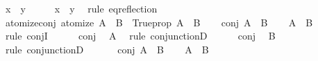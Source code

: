 \begin{isabellebody}
\ {\isachardoublequoteopen}x\ {\isacharequal}{\kern0pt}\ y{\isachardoublequoteclose}\isanewline
\ \ \isamarkupfalse%
\ \isamarkupfalse%
\ {\isachardoublequoteopen}x\ {\isasymequiv}\ y{\isachardoublequoteclose}\ \isamarkupfalse%
\ {\isacharparenleft}{\kern0pt}rule\ eq{\isacharunderscore}{\kern0pt}reflection{\isacharparenright}{\kern0pt}\isanewline
{}\isamarkupfalse%
%
\endisatagproof
{\isafoldproof}%
%
\isadelimproof
\isanewline
%
\endisadelimproof
\isanewline
{}\isamarkupfalse%
\ atomize{\isacharunderscore}{\kern0pt}conj\ {\isacharbrackleft}{\kern0pt}atomize{\isacharbrackright}{\kern0pt}{\isacharcolon}{\kern0pt}\ {\isachardoublequoteopen}{\isacharparenleft}{\kern0pt}A\ {\isacharampersand}{\kern0pt}{\isacharampersand}{\kern0pt}{\isacharampersand}{\kern0pt}\ B{\isacharparenright}{\kern0pt}\ {\isasymequiv}\ Trueprop\ {\isacharparenleft}{\kern0pt}A\ {\isasymand}\ B{\isacharparenright}{\kern0pt}{\isachardoublequoteclose}\isanewline
%
\isadelimproof
%
\endisadelimproof
%
\isatagproof
{}\isamarkupfalse%
\isanewline
\ \ \isamarkupfalse%
\ conj{\isacharcolon}{\kern0pt}\ {\isachardoublequoteopen}A\ {\isacharampersand}{\kern0pt}{\isacharampersand}{\kern0pt}{\isacharampersand}{\kern0pt}\ B{\isachardoublequoteclose}\isanewline
\ \ \isamarkupfalse%
\ {\isachardoublequoteopen}A\ {\isasymand}\ B{\isachardoublequoteclose}\isanewline
\ \ \isamarkupfalse%
\ {\isacharparenleft}{\kern0pt}rule\ conjI{\isacharparenright}{\kern0pt}\isanewline
\ \ \ \ \isamarkupfalse%
\ conj\ \isamarkupfalse%
\ A\ \isamarkupfalse%
\ {\isacharparenleft}{\kern0pt}rule\ conjunctionD{}{\isacharparenright}{\kern0pt}\isanewline
\ \ \ \ \isamarkupfalse%
\ conj\ \isamarkupfalse%
\ B\ \isamarkupfalse%
\ {\isacharparenleft}{\kern0pt}rule\ conjunctionD{}{\isacharparenright}{\kern0pt}\isanewline
\ \ \isamarkupfalse%
\isanewline
{}\isamarkupfalse%
\isanewline
\ \ \isamarkupfalse%
\ conj{\isacharcolon}{\kern0pt}\ {\isachardoublequoteopen}A\ {\isasymand}\ B{\isachardoublequoteclose}\isanewline
\ \ \isamarkupfalse%
\ {\isachardoublequoteopen}A\ {\isacharampersand}{\kern0pt}{\isacharampersand}{\kern0pt}{\isacharampersand}{\kern0pt}\ B{\isachardoublequoteclose}\isanewline
\ \ \isamarkupfalse%
\ {\isacharminus}{\kern0pt}\isanewline
\ \ \ \ \isamarkupfalse%

\end{isabellebody}
